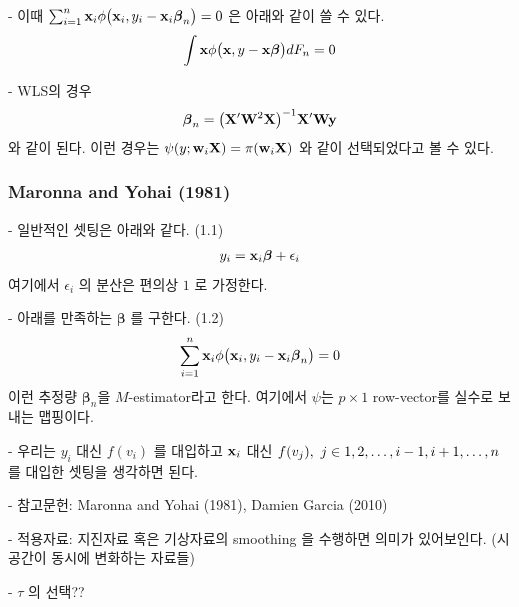 \documentclass[preprint, review, 12pt]{article}
\theoremstyle{definition}
\theoremstyle{remark}
\begin{document}
- 이때 $\sum_{i=1}^{n}{\bf x}_ i \phi\big({\bf x}_ i , y_i-{\bf x}_ i \boldsymbol{\beta}_ n\big) =0$ 은 아래와 같이 쓸 수 있다. 
\begin{align}
\int {\bf x} \phi\big({\bf x} , y-{\bf x} \boldsymbol{\beta}\big) dF_n=0 
\end{align}

- WLS의 경우 
\begin{align}
\boldsymbol{\beta}_ n = \big({\bf X}'{\bf W}^2{\bf X}\big)^{-1}{\bf X}'{\bf W}{\bf y}
\end{align}
와 같이 된다. 이런 경우는 $\psi(y;{\bf w}_ i {\bf X})= \pi({\bf w}_ i {\bf X}) $ 와 같이 선택되었다고 볼 수 있다. 

\subsubsection*{Maronna and Yohai (1981)}

- 일반적인 셋팅은 아래와 같다. (1.1) 
\begin{align}
y_i={\bf x}_ i \boldsymbol{\beta}  +\epsilon_i 
\end{align}
여기에서 $\epsilon_i$ 의 분산은 편의상 $1$ 로 가정한다. 

- 아래를 만족하는 $\boldsymbol{\beta}$ 를 구한다. (1.2) 
\begin{align}
\sum_{i=1}^{n}{\bf x}_ i \phi\big({\bf x}_ i , y_i-{\bf x}_ i \boldsymbol{\beta}_ n\big) =0 
\end{align}
이런 추정량 $\boldsymbol{\beta}_ n$을 $M$-estimator라고 한다. 여기에서 $\psi$는 $p\times 1$ row-vector를 실수로 보내는 맵핑이다. 

- 우리는 $y_i$ 대신 $f(v_i)$ 를 대입하고 ${\bf x}_ i$ 대신 $f(v_j),~ j\in\\{1,2,\dots,i-1,i+1,\dots,n\\}$ 를 대입한 셋팅을 생각하면 된다. 

- 참고문헌: Maronna and Yohai (1981), Damien Garcia (2010) 

- 적용자료: 지진자료 혹은 기상자료의 smoothing 을 수행하면 의미가 있어보인다. (시공간이 동시에 변화하는 자료들) 

- $\tau$ 의 선택??
\fi

\iffalse %
\end{document}

